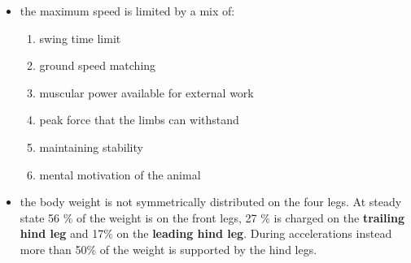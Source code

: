 \begin{itemize}
\item the maximum speed is limited by a mix of:
\begin{enumerate}
\item swing time limit
\item ground speed matching
\item muscular power available for external work
\item peak force that the limbs can withstand
\item maintaining stability
\item mental motivation of the animal 
\end{enumerate}

\item the body weight is not symmetrically distributed on the four legs. At steady state 56 \% of the weight is on the front legs, 27 \% is charged on the \textbf{trailing hind leg} and 17\% on the \textbf{leading hind leg}. During accelerations instead more than 50\% of the weight is supported by the hind legs.
\end{itemize}